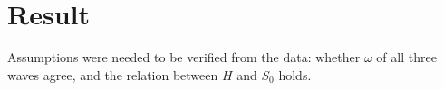 \section{Result}

Assumptions were needed to be verified from the data: whether $\omega$ of all three waves agree, and the relation between $H$ and $S_{0}$ holds.


